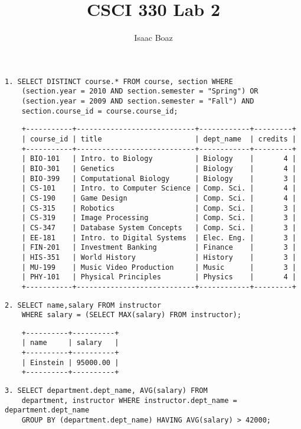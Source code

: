 \documentclass{article}
\title{CSCI 330 Lab 2}
\author{Isaac Boaz}
\begin{document}
\maketitle

\lstset{
    language=sql,
    basicstyle=\small,
    showstringspaces=false
}

\begin{lstlisting}
1. SELECT DISTINCT course.* FROM course, section WHERE
    (section.year = 2010 AND section.semester = "Spring") OR
    (section.year = 2009 AND section.semester = "Fall") AND
    section.course_id = course.course_id;
\end{lstlisting}
\begin{lstlisting}
    +-----------+----------------------------+------------+---------+
    | course_id | title                      | dept_name  | credits |
    +-----------+----------------------------+------------+---------+
    | BIO-101   | Intro. to Biology          | Biology    |       4 |
    | BIO-301   | Genetics                   | Biology    |       4 |
    | BIO-399   | Computational Biology      | Biology    |       3 |
    | CS-101    | Intro. to Computer Science | Comp. Sci. |       4 |
    | CS-190    | Game Design                | Comp. Sci. |       4 |
    | CS-315    | Robotics                   | Comp. Sci. |       3 |
    | CS-319    | Image Processing           | Comp. Sci. |       3 |
    | CS-347    | Database System Concepts   | Comp. Sci. |       3 |
    | EE-181    | Intro. to Digital Systems  | Elec. Eng. |       3 |
    | FIN-201   | Investment Banking         | Finance    |       3 |
    | HIS-351   | World History              | History    |       3 |
    | MU-199    | Music Video Production     | Music      |       3 |
    | PHY-101   | Physical Principles        | Physics    |       4 |
    +-----------+----------------------------+------------+---------+        
    \end{lstlisting}
\begin{lstlisting}
2. SELECT name,salary FROM instructor 
    WHERE salary = (SELECT MAX(salary) FROM instructor);
    \end{lstlisting}
\begin{lstlisting}
    +----------+----------+
    | name     | salary   |
    +----------+----------+
    | Einstein | 95000.00 |
    +----------+----------+
    \end{lstlisting}

\begin{lstlisting}
3. SELECT department.dept_name, AVG(salary) FROM
    department, instructor WHERE instructor.dept_name = department.dept_name
    GROUP BY (department.dept_name) HAVING AVG(salary) > 42000;
\end{lstlisting}
\end{document}
